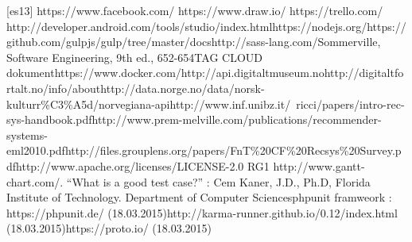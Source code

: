 [es13] https://www.facebook.com/ \newline
[es14] https://www.draw.io/ \newline
[es15] https://trello.com/ \newline
[es22] http://developer.android.com/tools/studio/index.html\newline
[es23] https://nodejs.org/\newline
[es24] https://github.com/gulpjs/gulp/tree/master/docs\newline
[es25] http://sass-lang.com/\newline
[AS6] Sommerville, Software Engineering, 9th ed., 652-654\newline  
[EHW1] TAG CLOUD dokument\newline
[EHW2] https://www.docker.com/\newline
[HM1] http://api.digitaltmuseum.no\newline
[HM2] http://digitaltfortalt.no/info/about\newline
[HM3] http://data.norge.no/data/norsk-kulturr\%C3\%A5d/norvegiana-api\newline
[HM4] http://www.inf.unibz.it/~ricci/papers/intro-rec-sys-handbook.pdf\newline
[HM5] http://www.prem-melville.com/publications/recommender-systems-eml2010.pdf\newline
[HM6] http://files.grouplens.org/papers/FnT\%20CF\%20Recsys\%20Survey.pdf\newline
[HM7] http://www.apache.org/licenses/LICENSE-2.0\newline
RG1 http://www.gantt-chart.com/. “What is a good test case?” : Cem Kaner, J.D., Ph.D, Florida Institute of Technology. Department of Computer Sciences\newline
[KF2] phpunit framweork : https://phpunit.de/ (18.03.2015)\newline
[KF3] http://karma-runner.github.io/0.12/index.html (18.03.2015)\newline
[KF4] https://proto.io/ (18.03.2015)\newline

\cleardoublepage